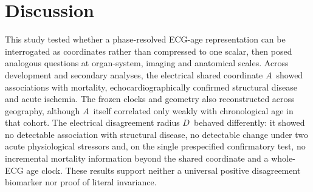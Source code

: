\documentclass[11pt]{article}
\newcommand{\D}{\ensuremath{D}}
\newcommand{\A}{\ensuremath{A}}
\begin{document}
\section{Discussion}

This study tested whether a phase-resolved ECG-age representation can be
interrogated as coordinates rather than compressed to one scalar, then posed
analogous questions at organ-system, imaging and anatomical scales. Across
development and secondary analyses, the electrical shared coordinate \A\ showed
associations with mortality, echocardiographically confirmed structural disease
and acute ischemia. The frozen clocks and geometry also reconstructed across
geography, although \A\ itself correlated only weakly with chronological age in
that cohort. The electrical disagreement radius \D\ behaved differently: it
showed no detectable association with structural disease, no detectable change
under two acute physiological stressors and, on the single prespecified
confirmatory test, no incremental mortality information beyond the shared
coordinate and a whole-ECG age clock. These results support neither a universal
positive disagreement biomarker nor proof of literal invariance.
\end{document}
